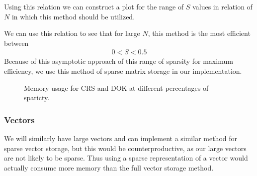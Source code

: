 \documentclass[../fem.tex]{subfile}
\begin{document}
Using this relation we can construct a plot for the range of $S$ values in
relation of $N$ in which this method should be utilized.

We can use this relation to see that for large $N$, this method is the most
efficient between
\begin{align*}
  0 < S < 0.5
\end{align*}
Because of this asymptotic approach of this range of sparsity for maximum
efficiency, we use this method of sparse matrix storage in our implementation.

\begin{figure}[htpb]
  \centering
  \caption{Memory usage for CRS and DOK at different percentages of
  sparicty.}
  \label{fig:mat_CRS}
\end{figure}

\subsubsection{Vectors}%
\label{ssub:vectors}

We will similarly have large vectors and can implement a similar method for
sparse vector storage, but this would be counterproductive, as our large
vectors are not likely to be sparse. Thus using a sparse representation of a
vector would actually consume more memory than the full vector storage method.
\end{document}
